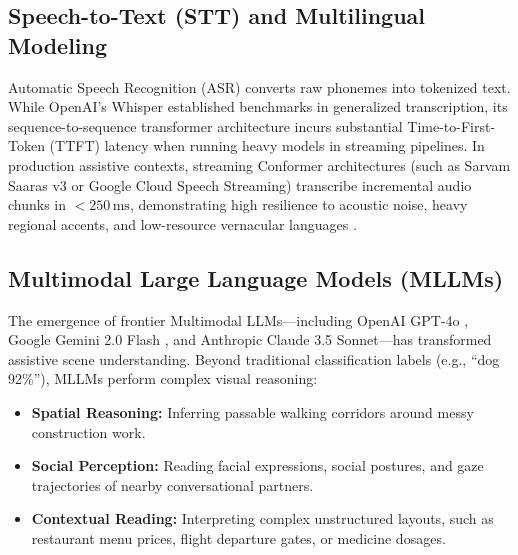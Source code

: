 \documentclass[10pt,twocolumn]{article}
\begin{document}
\subsection{Speech-to-Text (STT) and Multilingual Modeling}
Automatic Speech Recognition (ASR) converts raw phonemes into tokenized text. While OpenAI's Whisper \cite{radford2023robust} established benchmarks in generalized transcription, its sequence-to-sequence transformer architecture incurs substantial Time-to-First-Token (TTFT) latency when running heavy models in streaming pipelines. In production assistive contexts, streaming Conformer architectures (such as Sarvam Saaras v3 or Google Cloud Speech Streaming) transcribe incremental audio chunks in $<250\,\text{ms}$, demonstrating high resilience to acoustic noise, heavy regional accents, and low-resource vernacular languages \cite{sarvam2024}.

\subsection{Multimodal Large Language Models (MLLMs)}
The emergence of frontier Multimodal LLMs---including OpenAI GPT-4o \cite{achiam2023gpt4}, Google Gemini 2.0 Flash \cite{team2024gemini}, and Anthropic Claude 3.5 Sonnet---has transformed assistive scene understanding. Beyond traditional classification labels (e.g., ``dog 92\%''), MLLMs perform complex visual reasoning:
\begin{itemize}[leftmargin=*]
    \item \textbf{Spatial Reasoning:} Inferring passable walking corridors around messy construction work.
    \item \textbf{Social Perception:} Reading facial expressions, social postures, and gaze trajectories of nearby conversational partners.
    \item \textbf{Contextual Reading:} Interpreting complex unstructured layouts, such as restaurant menu prices, flight departure gates, or medicine dosages.
\end{itemize}
\end{document}
